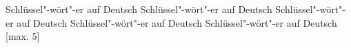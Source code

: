 Schlüssel"-wört"-er auf Deutsch   Schlüssel"-wört"-er auf Deutsch   Schlüssel"-wört"-er auf Deutsch   Schlüssel"-wört"-er auf Deutsch   Schlüssel"-wört"-er auf Deutsch   [max. 5]